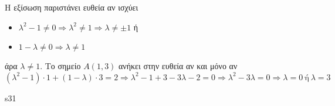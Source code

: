 
Η εξίσωση παριστάνει ευθεία αν ισχύει
\begin{itemize}
\item $\lambda^2-1\neq 0\Rightarrow \lambda^2\neq 1\Rightarrow \lambda\neq\pm 1$ ή
\item $1-\lambda\neq 0\Rightarrow \lambda\neq 1$
\end{itemize}
άρα $ \lambda\neq 1 $. Το σημείο $ A(1,3) $ ανήκει στην ευθεία αν και μόνο αν
\[ \left(\lambda^2-1\right)\cdot 1+(1-\lambda)\cdot 3=2\Rightarrow \lambda^2-1+3-3\lambda-2=0\Rightarrow \lambda^2-3\lambda=0\Rightarrow \lambda=0\ \text{ή}\ \lambda=3 \]

s31


